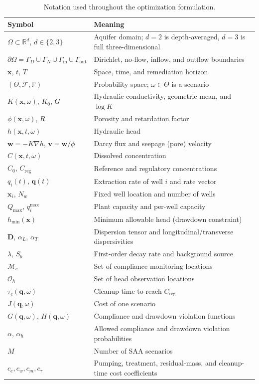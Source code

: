 \documentclass[11pt]{article}
\numberwithin{equation}{section}
\newcommand{\R}{\mathbb{R}}
\newcommand{\Prob}{\mathbb{P}}
\newcommand{\xx}{\mathbf{x}}
\newcommand{\vv}{\mathbf{v}}
\newcommand{\ww}{\mathbf{w}}
\newcommand{\DD}{\mathbf{D}}
\newcommand{\tabhead}[1]{\textbf{#1}}
\theoremstyle{plain}
\begin{document}
\begin{table}[htbp]
\centering
\small
\begin{tabularx}{\textwidth}{@{}lY@{}}
\toprule
\tabhead{Symbol} & \tabhead{Meaning}\\
\midrule
$\Omega\subset\R^d$, $d\in\{2,3\}$ & Aquifer domain; $d=2$ is depth-averaged,
$d=3$ is full three-dimensional\\
$\partial\Omega=\Gamma_D\cup\Gamma_N\cup\Gamma_{\mathrm{in}}\cup
 \Gamma_{\mathrm{out}}$ & Dirichlet, no-flow, inflow, and outflow boundaries\\
$\xx$, $t$, $T$ & Space, time, and remediation horizon\\
$(\Theta,\mathcal{F},\Prob)$ & Probability space; $\omega\in\Theta$ is a
scenario\\
$K(\xx,\omega)$, $K_0$, $G$ & Hydraulic conductivity, geometric mean, and
$\log K$\\
$\phi(\xx,\omega)$, $R$ & Porosity and retardation factor\\
$h(\xx,t,\omega)$ & Hydraulic head\\
$\ww=-K\nabla h$, $\vv=\ww/\phi$ & Darcy flux and seepage (pore) velocity\\
$C(\xx,t,\omega)$ & Dissolved concentration\\
$C_0$, $C_{\mathrm{reg}}$ & Reference and regulatory concentrations\\
$q_i(t)$, $\mathbf{q}(t)$ & Extraction rate of well $i$ and rate vector\\
$\xx_i$, $N_w$ & Fixed well location and number of wells\\
$Q_{\max}$, $q_i^{\max}$ & Plant capacity and per-well capacity\\
$h_{\min}(\xx)$ & Minimum allowable head (drawdown constraint)\\
$\DD$, $\alpha_L$, $\alpha_T$ & Dispersion tensor and longitudinal/transverse
dispersivities\\
$\lambda$, $S_b$ & First-order decay rate and background source\\
$\mathcal{M}_c$ & Set of compliance monitoring locations\\
$\mathcal{O}_h$ & Set of head observation locations\\
$\tau_c(\mathbf{q},\omega)$ & Cleanup time to reach $C_{\mathrm{reg}}$\\
$J(\mathbf{q},\omega)$ & Cost of one scenario\\
$G(\mathbf{q},\omega)$, $H(\mathbf{q},\omega)$ & Compliance and drawdown
violation functions\\
$\alpha$, $\alpha_h$ & Allowed compliance and drawdown violation
probabilities\\
$M$ & Number of SAA scenarios\\
$c_e,c_w,c_m,c_\tau$ & Pumping, treatment, residual-mass, and cleanup-time
cost coefficients\\
\bottomrule
\end{tabularx}
\caption{Notation used throughout the optimization formulation.}
\label{tab:notation}
\end{table}
\end{document}
